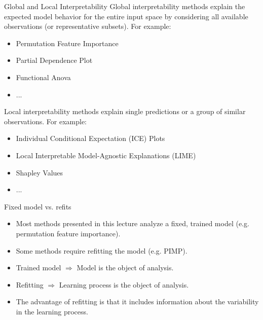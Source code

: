 \documentclass[11pt,compress,t,notes=noshow, xcolor=table]{beamer}
\begin{document}
\begin{vbframe}{Global and Local Interpretability}
Global interpretability methods explain the expected model behavior for the entire input space by considering all available observations (or representative subsets). For example:
  \begin{itemize}
    \item Permutation Feature Importance
    \item Partial Dependence Plot
    \item Functional Anova
    \item ...
  \end{itemize}
\lz
Local interpretability methods explain single predictions or a group of similar observations. For example:
 \begin{itemize}
  \item Individual Conditional Expectation (ICE) Plots
  \item Local Interpretable Model-Agnostic Explanations (LIME)
  \item Shapley Values
  \item ...
 \end{itemize}
\end{vbframe}


\begin{vbframe}{Fixed model vs. refits}
  \begin{itemize}
     \itemsep2em
     \item Most methods presented in this lecture analyze a fixed, trained model 
     (e.g. permutation feature importance).
     \item Some methods require refitting the model (e.g. PIMP).
     \item Trained model $\Rightarrow$ Model is the object of analysis.
     \item Refitting $\Rightarrow$ Learning process is the object of analysis.
     \item The advantage of refitting is that it includes information about the variability in the learning process.
  \end{itemize}
\end{vbframe}
\end{document}
